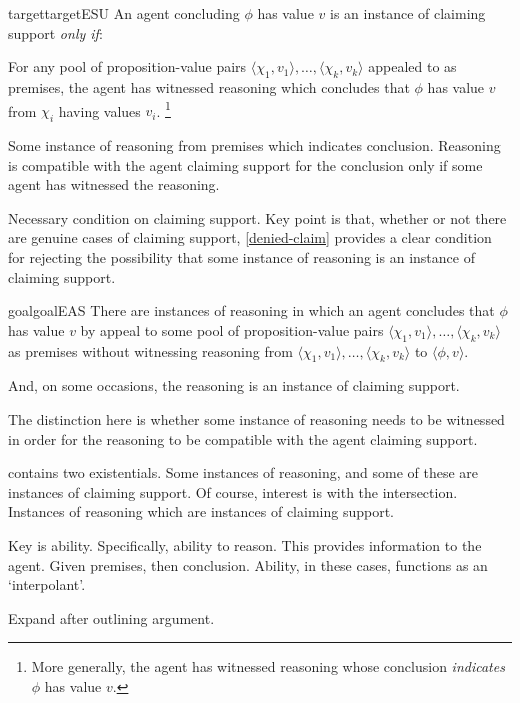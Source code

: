 \begin{note}
  \begin{restatable}{target}{targetESU}
    \label{denied-claim}
    An agent concluding \(\phi\) has value \(v\) is an instance of claiming support \emph{only if}:

    For any pool of proposition-value pairs \(\langle \chi_{1},v_{1} \rangle,\dots,\langle \chi_{k},v_{k} \rangle\) appealed to as premises, the agent has witnessed reasoning which concludes that \(\phi\) has value \(v\) from \(\chi_{i}\) having values \(v_{i}\).\nolinebreak
    \footnote{More generally, the agent has witnessed reasoning whose conclusion \emph{indicates} \(\phi\) has value \(v\).}
  \end{restatable}


  Some instance of reasoning from premises which indicates conclusion.
  Reasoning is compatible with the agent claiming support for the conclusion only if some agent has witnessed the reasoning.

  Necessary condition on claiming support.
  Key point is that, whether or not there are genuine cases of claiming support, \autoref{denied-claim} provides a clear condition for rejecting the possibility that some instance of reasoning is an instance of claiming support.
\end{note}

\begin{note}
  \begin{restatable}{goal}{goalEAS}
    \label{prop:EAS}
    There are instances of reasoning in which an agent concludes that \(\phi\) has value \(v\) by appeal to some pool of proposition-value pairs \(\langle \chi_{1},v_{1} \rangle,\dots,\langle \chi_{k},v_{k} \rangle\) as premises without witnessing reasoning from \(\langle \chi_{1},v_{1} \rangle,\dots,\langle \chi_{k},v_{k} \rangle\) to \(\langle \phi,v \rangle\).

    And, on some occasions, the reasoning is an instance of claiming support.
  \end{restatable}
\end{note}

\begin{note}
  The distinction here is whether some instance of reasoning needs to be witnessed in order for the reasoning to be compatible with the agent claiming support.

  \EAS{} contains two existentials.
  Some instances of reasoning, and some of these are instances of claiming support.
  Of course, interest is with the intersection.
  Instances of reasoning which are instances of claiming support.

  Key is ability.
  Specifically, ability to reason.
  This provides information to the agent.
  Given premises, then conclusion.
  Ability, in these cases, functions as an `interpolant'.

  Expand after outlining argument.
\end{note}

